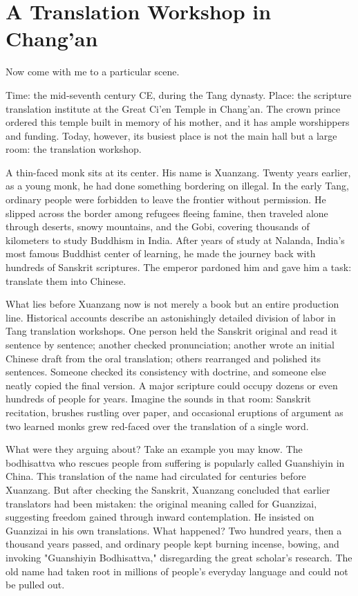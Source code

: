 \section{A Translation Workshop in Chang'an}
Now come with me to a particular scene.

Time: the mid-seventh century CE, during the Tang dynasty. Place: the scripture translation institute at the Great Ci'en Temple in Chang'an. The crown prince ordered this temple built in memory of his mother, and it has ample worshippers and funding. Today, however, its busiest place is not the main hall but a large room: the translation workshop.

A thin-faced monk sits at its center. His name is Xuanzang. Twenty years earlier, as a young monk, he had done something bordering on illegal. In the early Tang, ordinary people were forbidden to leave the frontier without permission. He slipped across the border among refugees fleeing famine, then traveled alone through deserts, snowy mountains, and the Gobi, covering thousands of kilometers to study Buddhism in India. After years of study at Nalanda, India's most famous Buddhist center of learning, he made the journey back with hundreds of Sanskrit scriptures. The emperor pardoned him and gave him a task: translate them into Chinese.

What lies before Xuanzang now is not merely a book but an entire production line. Historical accounts describe an astonishingly detailed division of labor in Tang translation workshops. One person held the Sanskrit original and read it sentence by sentence; another checked pronunciation; another wrote an initial Chinese draft from the oral translation; others rearranged and polished its sentences. Someone checked its consistency with doctrine, and someone else neatly copied the final version. A major scripture could occupy dozens or even hundreds of people for years. Imagine the sounds in that room: Sanskrit recitation, brushes rustling over paper, and occasional eruptions of argument as two learned monks grew red-faced over the translation of a single word.

What were they arguing about? Take an example you may know. The bodhisattva who rescues people from suffering is popularly called Guanshiyin in China. This translation of the name had circulated for centuries before Xuanzang. But after checking the Sanskrit, Xuanzang concluded that earlier translators had been mistaken: the original meaning called for Guanzizai, suggesting freedom gained through inward contemplation. He insisted on Guanzizai in his own translations. What happened? Two hundred years, then a thousand years passed, and ordinary people kept burning incense, bowing, and invoking "Guanshiyin Bodhisattva," disregarding the great scholar's research. The old name had taken root in millions of people's everyday language and could not be pulled out.

